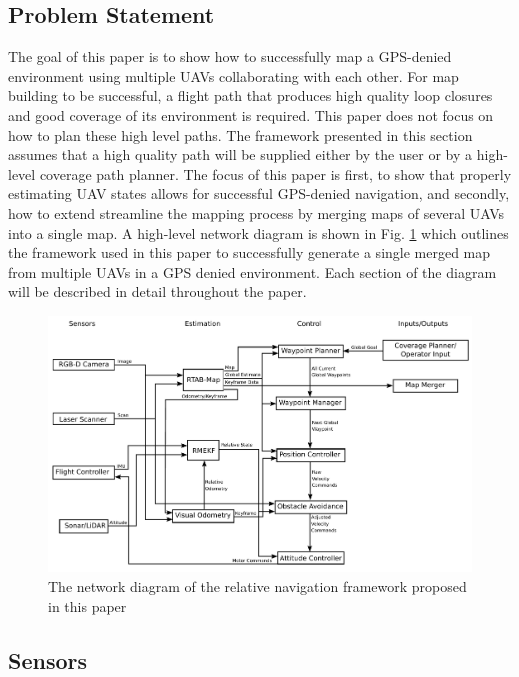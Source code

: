 \documentclass[letterpaper, 10 pt, conference]{ieeeconf}  %
\begin{document}
\subsection{Problem Statement}

The goal of this paper is to show how to successfully map a GPS-denied environment using multiple UAVs collaborating with each other. For map building to be successful, a flight path that produces high quality loop closures and good coverage of its environment is required. This paper does not focus on how to plan these high level paths. The framework presented in this section assumes that a high quality path will be supplied either by the user or by a high-level coverage path planner. The focus of this paper is first, to show that properly estimating UAV states allows for successful GPS-denied navigation, and secondly, how to extend streamline the mapping process by merging maps of several UAVs into a single map. A high-level network diagram is shown in Fig. \ref{fig:rtab_network} which outlines the framework used in this paper to successfully generate a single merged map from multiple UAVs in a GPS denied environment. Each section of the diagram will be described in detail throughout the paper.

\begin{figure}
\centering
\includegraphics[width=1.0\linewidth]{rtab_relative_nav_network}
\caption{The network diagram of the relative navigation framework proposed in this paper}
\label{fig:rtab_network}
\end{figure}

\subsection{Sensors}
\end{document}
